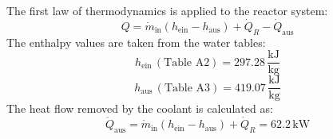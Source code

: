 The first law of thermodynamics is applied to the reactor system:  
\[
Q = \dot{m}_{\text{in}} (h_{\text{ein}} - h_{\text{aus}}) + \dot{Q}_R - \dot{Q}_{\text{aus}}
\]  
The enthalpy values are taken from the water tables:  
\[
h_{\text{ein}} \, (\text{Table A2}) = 297.28 \, \frac{\text{kJ}}{\text{kg}}
\]  
\[
h_{\text{aus}} \, (\text{Table A3}) = 419.07 \, \frac{\text{kJ}}{\text{kg}}
\]  
The heat flow removed by the coolant is calculated as:  
\[
\dot{Q}_{\text{aus}} = \dot{m}_{\text{in}} (h_{\text{ein}} - h_{\text{aus}}) + \dot{Q}_R = 62.2 \, \text{kW}
\]